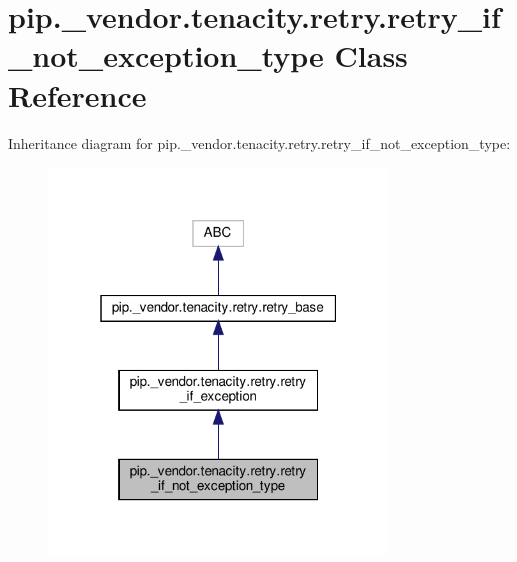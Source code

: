 \hypertarget{classpip_1_1__vendor_1_1tenacity_1_1retry_1_1retry__if__not__exception__type}{}\section{pip.\+\_\+vendor.\+tenacity.\+retry.\+retry\+\_\+if\+\_\+not\+\_\+exception\+\_\+type Class Reference}
\label{classpip_1_1__vendor_1_1tenacity_1_1retry_1_1retry__if__not__exception__type}


Inheritance diagram for pip.\+\_\+vendor.\+tenacity.\+retry.\+retry\+\_\+if\+\_\+not\+\_\+exception\+\_\+type\+:
\nopagebreak
\begin{figure}[H]
\begin{center}
\leavevmode
\includegraphics[width=256pt]{classpip_1_1__vendor_1_1tenacity_1_1retry_1_1retry__if__not__exception__type__inherit__graph}
\end{center}
\end{figure}



